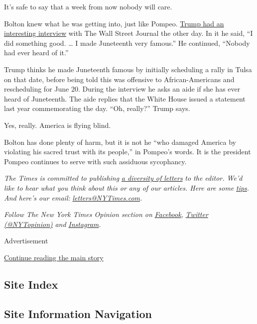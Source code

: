 It's safe to say that a week from now nobody will care.

Bolton knew what he was getting into, just like Pompeo.
\href{https://www.wsj.com/articles/trump-talks-juneteenth-john-bolton-economy-in-wsj-interview-11592493771}{Trump
had an interesting interview} with The Wall Street Journal the other
day. In it he said, ``I did something good. \ldots{} I made Juneteenth
very famous.'' He continued, ``Nobody had ever heard of it.''

Trump thinks he made Juneteenth famous by initially scheduling a rally
in Tulsa on that date, before being told this was offensive to
African-Americans and rescheduling for June 20. During the interview he
asks an aide if she has ever heard of Juneteenth. The aide replies that
the White House issued a statement last year commemorating the day.
``Oh, really?'' Trump says.

Yes, really. America is flying blind.

Bolton has done plenty of harm, but it is not he ``who damaged America
by violating his sacred trust with its people,'' in Pompeo's words. It
is the president Pompeo continues to serve with such assiduous
sycophancy.

\emph{The Times is committed to publishing}
\href{https://www.nytimes3xbfgragh.onion/2019/01/31/opinion/letters/letters-to-editor-new-york-times-women.html}{\emph{a
diversity of letters}} \emph{to the editor. We'd like to hear what you
think about this or any of our articles. Here are some}
\href{https://help.nytimes3xbfgragh.onion/hc/en-us/articles/115014925288-How-to-submit-a-letter-to-the-editor}{\emph{tips}}\emph{.
And here's our email:}
\href{mailto:letters@NYTimes.com}{\emph{letters@NYTimes.com}}\emph{.}

\emph{Follow The New York Times Opinion section on}
\href{https://www.facebookcorewwwi.onion/nytopinion}{\emph{Facebook}}\emph{,}
\href{http://twitter.com/NYTOpinion}{\emph{Twitter (@NYTopinion)}}
\emph{and}
\href{https://www.instagram.com/nytopinion/}{\emph{Instagram}}\emph{.}

Advertisement

\protect\hyperlink{after-bottom}{Continue reading the main story}

\hypertarget{site-index}{%
\subsection{Site Index}\label{site-index}}

\hypertarget{site-information-navigation}{%
\subsection{Site Information
Navigation}\label{site-information-navigation}}

